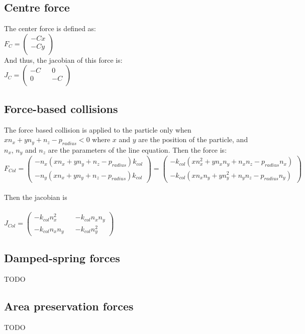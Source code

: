 \documentclass[10pt,a4paper]{report}
\begin{document}
\subsection*{Centre force}
The center force is defined as:\\
$
F_C=\begin{pmatrix}
-Cx\\
-Cy\\
\end{pmatrix}
$\\
And thus, the jacobian of this force is:\\
$
J_C=\begin{pmatrix}
-C && 0\\
0 && -C\\
\end{pmatrix}
$\\
\subsection*{Force-based collisions}
The force based collision is applied to the particle only when\\
$xn_x+yn_y+n_z-p_{radius} < 0$ where $x$ and $y$ are the position of the particle, and $n_x$, $n_y$ and $n_z$ are the parameters of the line equation. Then the force is:\\
$
F_{Col}=\begin{pmatrix}
-n_x(xn_x+yn_y+n_z-p_{radius})k_{col}\\
-n_y(xn_x+yn_y+n_z-p_{radius})k_{col}
\end{pmatrix}
=
\begin{pmatrix}
-k_{col}(xn_x^2+yn_xn_y+n_xn_z-p_{radius}n_x)\\
-k_{col}(xn_xn_y+yn_y^2+n_yn_z-p_{radius}n_y)
\end{pmatrix}
$\\\\
Then the jacobian is\\\\
$
J_{Col}=\begin{pmatrix}
-k_{col}n_x^2 	&& -k_{col}n_xn_y\\
-k_{col}n_xn_y 	&& -k_{col}n_y^2
\end{pmatrix}
$
\subsection*{Damped-spring forces}
TODO\\
\subsection*{Area preservation forces}
TODO\\
\end{document}
